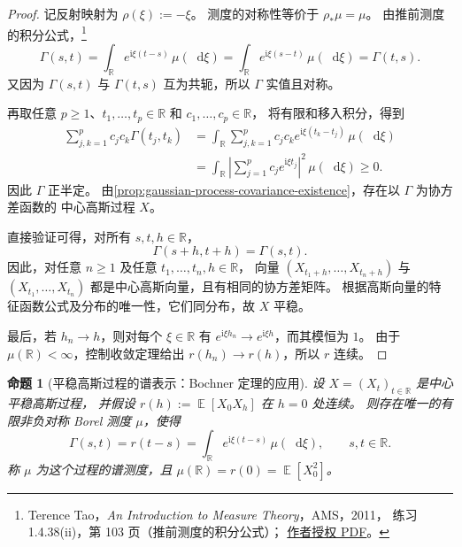 \documentclass[UTF8,11pt,a4paper,oneside,fontset=fandol]{ctexrep}
\numberwithin{equation}{section}
\theoremstyle{plain}
\newtheorem{proposition}[theorem]{命题}
\theoremstyle{definition}
\theoremstyle{remark}
\newcommand{\R}{\mathbb{R}}
\DeclareMathOperator{\E}{\mathbb{E}}
\newcommand{\dd}{\mathop{}\!\mathrm{d}}
\begin{document}
\begin{proof}
记反射映射为 $\rho(\xi):=-\xi$。
测度的对称性等价于 $\rho_*\mu=\mu$。
由推前测度的积分公式，\footnote{%
Terence Tao，\emph{An Introduction to Measure Theory}，AMS，2011，
练习 1.4.38(ii)，第 103 页（推前测度的积分公式）；
\href{https://terrytao.wordpress.com/wp-content/uploads/2012/12/gsm-126-tao5-measure-book.pdf}{作者授权 PDF}。}
\[
  \Gamma(s,t)=\int_{\R}e^{\mathrm i\xi (t-s)}\,\mu(\dd\xi)
       =\int_{\R}e^{\mathrm i\xi (s-t)}\,\mu(\dd\xi)=\Gamma(t,s).
\]
又因为 $\Gamma(s,t)$ 与 $\Gamma(t,s)$ 互为共轭，所以 $\Gamma$ 实值且对称。

再取任意 $p\ge1$、$t_1,\ldots,t_p\in\R$ 和 $c_1,\ldots,c_p\in\R$，
将有限和移入积分，得到
\begin{align*}
  \sum_{j,k=1}^{p}c_jc_k\Gamma(t_j,t_k)
  &=\int_{\R}\sum_{j,k=1}^{p}
       c_jc_k e^{\mathrm i\xi(t_k-t_j)}\,\mu(\dd\xi)\\
  &=\int_{\R}\left|\sum_{j=1}^{p}c_j e^{\mathrm i\xi t_j}\right|^2
       \,\mu(\dd\xi)\ge0.
\end{align*}
因此 $\Gamma$ 正半定。
由\cref{prop:gaussian-process-covariance-existence}，存在以 $\Gamma$ 为协方差函数的
中心高斯过程 $X$。

直接验证可得，对所有 $s,t,h\in\R$，
\[
  \Gamma(s+h,t+h)=\Gamma(s,t).
\]
因此，对任意 $n\ge1$ 及任意 $t_1,\ldots,t_n,h\in\R$，
向量 $(X_{t_1+h},\ldots,X_{t_n+h})$ 与 $(X_{t_1},\ldots,X_{t_n})$
都是中心高斯向量，且有相同的协方差矩阵。
根据高斯向量的特征函数公式及分布的唯一性，它们同分布，故 $X$ 平稳。

最后，若 $h_n\to h$，则对每个 $\xi\in\R$ 有
$e^{\mathrm i\xi h_n}\to e^{\mathrm i\xi h}$，而其模恒为 $1$。
由于 $\mu(\R)<\infty$，控制收敛定理给出 $r(h_n)\to r(h)$，所以 $r$ 连续。
\end{proof}

\begin{proposition}[平稳高斯过程的谱表示：Bochner 定理的应用]
\label{prop:stationary-gaussian-bochner}
设 $X=(X_t)_{t\in\R}$ 是中心平稳高斯过程，
并假设 $r(h):=\E[X_0X_h]$ 在 $h=0$ 处连续。
则存在唯一的有限非负对称 Borel 测度 $\mu$，使得
\[
  \Gamma(s,t)=r(t-s)
  =\int_{\R}e^{\mathrm i\xi(t-s)}\,\mu(\dd\xi),
  \qquad s,t\in\R.
\]
称 $\mu$ 为这个过程的谱测度，且 $\mu(\R)=r(0)=\E[X_0^2]$。
\end{proposition}
\end{document}
